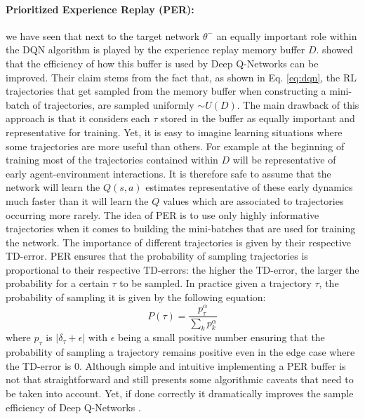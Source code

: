 \paragraph{Prioritized Experience Replay (PER):} we have seen that next to the target network $\theta^{-}$ an equally important role within the DQN algorithm is played by the experience replay memory buffer $D$. \citet{schaul2015prioritized} showed that the efficiency of how this buffer is used by Deep Q-Networks can be improved. Their claim stems from the fact that, as shown in Eq. \ref{eq:dqn}, the RL trajectories that get sampled from the memory buffer when constructing a mini-batch of trajectories, are sampled uniformly $\sim U(D)$. The main drawback of this approach is that it considers each $\tau$ stored in the buffer as equally important and representative for training. Yet, it is easy to imagine learning situations where some trajectories are more useful than others. For example at the beginning of training most of the trajectories contained within $D$ will be representative of early agent-environment interactions. It is therefore safe to assume that the network will learn the $Q(s,a)$ estimates representative of these early dynamics much faster than it will learn the $Q$ values which are associated to trajectories occurring more rarely. The idea of PER is to use only highly informative trajectories when it comes to building the mini-batches that are used for training the network. The importance of different trajectories is given by their respective TD-error. PER ensures that the probability of sampling trajectories is proportional to their respective TD-errors: the higher the TD-error, the larger the probability for a certain $\tau$ to be sampled. In practice given a trajectory $\tau$, the probability of sampling it is given by the following equation:
\begin{equation}
	P(\tau)=\frac{p_{\tau}^{\alpha}}{\sum_k p_{k}^{\alpha}}
\end{equation}
where $p_{\tau}$ is $|\delta_\tau + \epsilon|$ with $\epsilon$ being a small positive number ensuring that the probability of sampling a trajectory remains positive even in the edge case where the TD-error is $0$. Although simple and intuitive implementing a PER buffer is not that straightforward and still presents some algorithmic caveats that need to be taken into account. Yet, if done correctly it dramatically improves the sample efficiency of Deep Q-Networks \cite{narasimhan2015language}.

